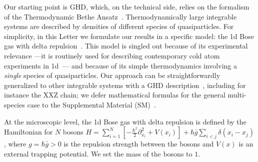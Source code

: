\documentclass[twocolumn,amsfonts,showpacs,superscriptaddress]{revtex4-1}
\begin{document}
Our starting point is GHD, which, on the technical side, relies on the formalism of the Thermodynamic Bethe Ansatz~\cite{yang1969thermodynamics,takahashi2005thermodynamics}. Thermodynamically large integrable systems are described by densities of different species of quasiparticles. For simplicity,
in this Letter we formulate our results in a specific model: the 1d Bose gas with delta repulsion~\cite{lieb1963exact,berezin1964schrodinger,korepin1997quantum}. This model is singled out because of its experimental relevance ---it is routinely used for describing contemporary cold atom experiments in 1d~\cite{olshanii1998atomic,van2008yang,vogler2013thermodynamics,schemmer2019generalized,wilson2019observation}--- and because of its simple thermodynamics involving a {\it single} species of quasiparticles. Our approach can be straightforwardly generalized to other integrable systems with a GHD description~\cite{piroli2017transport,ilievski2017microscopic,ilievski2017ballistic,doyon2017large,doyon2017drude,bulchandani2018bethe,collura2018analytic,doyon2018soliton,cao2018incomplete,doyon2018exact,bastianello2018generalized,de2018hydrodynamic,10.21468/SciPostPhys.6.4.049,gopalakrishnan2018hydrodynamics,mazza2018energy,vu2018equations,borsi2019current,doyon2019generalised,bulchandani2019kinetic,spohn2019generalized,bastianello2019generalized,panfil2019linearized,alba2019towards,agrawal2019generalized,cubero2019generalized,bertini2019GHD,mestyan2019GHD,bertini2018GHD,bertini2019GHDb,mestyan2019GHDb}, including for instance the XXZ chain; we defer mathematical formulas for the general multi-species case to the Supplemental Material (SM)~\cite{SM}.




At the microscopic level, the 1d Bose gas with delta repulsion is defined by the Hamiltonian for $N$ bosons $H = \sum_{i=1}^N [-\frac{\hbar^2}{2} \partial_{x_i}^2 + V(x_i)] + \hbar \bar{g} \sum_{i<j} \delta(x_i-x_j) $, where $g = \hbar \bar{g} >0$ is the repulsion strength between the bosons and $V(x)$ is an external trapping potential. 
We set the mass of the bosons to $1$. 
\end{document}
